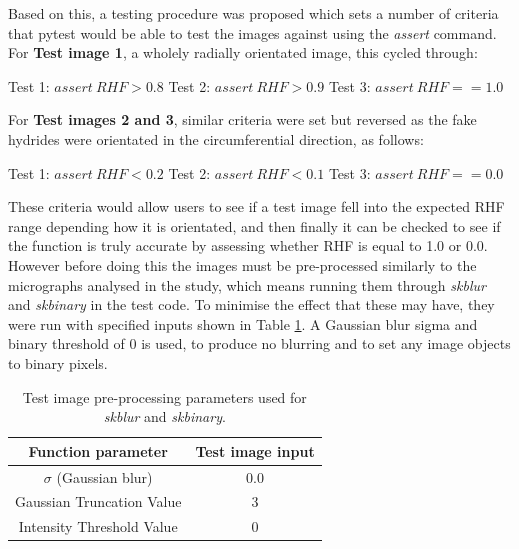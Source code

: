 \documentclass{article}
\begin{document}
Based on this, a testing procedure was proposed which sets a number of criteria that pytest would be able to test the images against using the \textit{assert} command. For \textbf{Test image 1}, a wholely radially orientated image, this cycled through:

\begin{center}
    Test 1: $assert\:RHF > 0.8$ \newline
    Test 2: $assert\:RHF > 0.9$ \newline
    Test 3: $assert\:RHF == 1.0$ \newline
\end{center}

For \textbf{Test images 2 and 3}, similar criteria were set but reversed as the fake hydrides were orientated in the circumferential direction, as follows:
\begin{center}
    Test 1: $assert\:RHF < 0.2$ \newline
    Test 2: $assert\:RHF < 0.1$ \newline
    Test 3: $assert\:RHF == 0.0$ \newline 
\end{center}

These criteria would allow users to see if a test image fell into the expected RHF range depending how it is orientated, and then finally it can be checked to see if the function is truly accurate by assessing whether RHF is equal to 1.0 or 0.0.  However before doing this the images must be pre-processed similarly to the micrographs analysed in the study, which means running them through \textit{skblur} and \textit{skbinary} in the test code. To minimise the effect that these may have, they were run with specified inputs shown in Table \ref{tab:TestImageTable}. A Gaussian blur sigma and binary threshold of 0 is used, to produce no blurring and to set any image objects to binary pixels.

\begin{table}[h]
    \centering
    \begin{tabular}{|c|c|}
    \hline
        \textbf{Function parameter} & \textbf{Test image input}  \\
        \hline
        $\sigma$ (Gaussian blur) & 0.0 \\
        \hline
        Gaussian Truncation Value & 3 \\
        \hline
        Intensity Threshold Value & 0 \\ 
    \hline
    \end{tabular}
    \caption{Test image pre-processing parameters used for \textit{skblur} and \textit{skbinary}.}
    \label{tab:TestImageTable}
\end{table}
\end{document}
